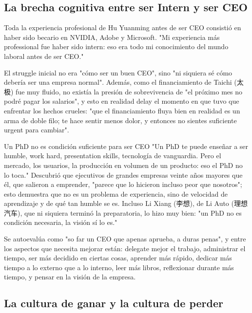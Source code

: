 \subsection{La brecha cognitiva entre ser Intern y ser CEO}

Toda la experiencia profesional de Hu Yuanming antes de ser CEO consistió en haber sido becario en NVIDIA, Adobe y Microsoft. "Mi experiencia más professional fue haber sido intern: eso era todo mi conocimiento del mundo laboral antes de ser CEO."

El struggle inicial no era "cómo ser un buen CEO", sino "ni siquiera sé cómo debería ser una empresa normal". Además, como el financiamiento de Taichi (太极) fue muy fluido, no existía la presión de sobrevivencia de "el próximo mes no podré pagar los salarios", y esto en realidad delay el momento en que tuvo que enfrentar los hechos crueles: "que el financiamiento fluya bien en realidad es un arma de doble filo; te hace sentir menos dolor, y entonces no sientes suficiente urgent para cambiar".

\begin{knowledgebox}{Un PhD no es condición suficiente para ser CEO}
"Un PhD te puede enseñar a ser humble, work hard, presentation skills, tecnología de vanguardia. Pero el mercado, los usuarios, la producción en volumen de un producto: eso el PhD no lo toca." Descubrió que ejecutivos de grandes empresas veinte años mayores que él, que salieron a emprender, "parece que lo hicieron incluso peor que nosotros"; esto demuestra que no es un problema de experiencia, sino de velocidad de aprendizaje y de qué tan humble se es. Incluso Li Xiang (李想), de Li Auto (理想汽车), que ni siquiera terminó la preparatoria, lo hizo muy bien: "un PhD no es condición necesaria, la visión sí lo es."
\end{knowledgebox}

Se autoevalúa como "so far un CEO que apenas aprueba, a duras penas", y entre los aspectos que necesita mejorar están: delegate mejor el trabajo, administrar el tiempo, ser más decidido en ciertas cosas, aprender más rápido, dedicar más tiempo a lo externo que a lo interno, leer más libros, reflexionar durante más tiempo, y pensar en la visión de la empresa.

\subsection{La cultura de ganar y la cultura de perder}

